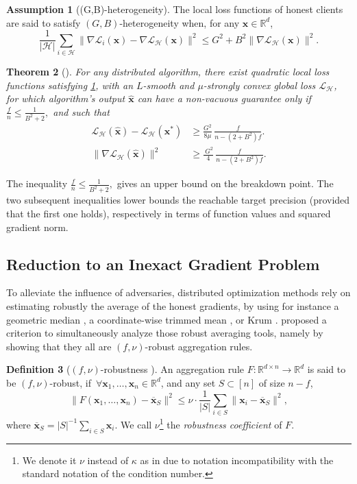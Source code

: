 \documentclass{article}
\def\vx{{\bm{x}}}
\newcommand{\R}{\mathbb{R}}
\newcommand{\cH}{\mathcal{H}}
\newcommand{\cL}{\mathcal{L}}
\theoremstyle{plain}
\newtheorem{theorem}{Theorem}[section]
\theoremstyle{definition}
\newtheorem{definition}[theorem]{Definition}
\newtheorem{assumption}[theorem]{Assumption}
\theoremstyle{remark}
\begin{document}
\begin{assumption}[(G,B)-heterogeneity]
\label{asmpt:GB_heterogeneity}
    The local loss functions of honest clients are said to satisfy {$(G,B)$-heterogeneity} when, for any $\vx \in \R^d$, 
    \[
    \frac{1}{|\cH|}\sum_{i \in \cH} \|\nabla \cL_i(\vx) - \nabla \cL_{\cH}(\vx)\|^2 \le G^2 + B^2\|\nabla \cL_{\cH}(\vx)\|^2.
    \]
\end{assumption}

    


\begin{theorem}[\citet{allouah2024robust}]
\label{thm:allouha_lower_bound}
  For any distributed algorithm, there exist quadratic local loss functions satisfying \cref{asmpt:GB_heterogeneity}, with an $L$-smooth and $\mu$-strongly convex global loss $\cL_{\cH}$, for which  algorithm's  output $\hat{\vx}$ can have a non-vacuous guarantee only if $ \frac{f}{n}\le \frac{1}{B^2 + 2},$ and  such that
    \begin{align}
     \cL_{\cH}(\hat{\vx}) - \cL_{\cH}(\vx^*) &\ge \frac{G^2}{8\mu} \, \frac{f}{n - (2+B^2)f}. \label{eq:lb_functionvalue}\\
 \|\nabla \cL_{\cH}(\hat{\vx})\|^2 &\ge \frac{\:G^2}{4}\,\frac{f}{n - (2+B^2)f}. \label{eq:lb_gradnorm}
\end{align}
\end{theorem}
The  inequality $ \frac{f}{n}\le \frac{1}{B^2 + 2},$ gives an upper bound on the breakdown point. The two subsequent inequalities lower bounds the reachable target precision (provided that the first one holds), respectively in terms of function values and squared gradient norm.


\subsection{Reduction to an Inexact Gradient Problem}
\label{subsec:reduction}
To alleviate the influence of adversaries, distributed optimization methods rely on estimating robustly the average of the honest gradients, by using for instance a geometric median \citep{small1990survey, pillutla2022robust}, a coordinate-wise trimmed mean \citep{yin2018byzantine}, or Krum \citep{blanchard2017machine}. \citet{allouah2023fixing} proposed a criterion to simultaneously analyze those robust averaging tools, namely by showing that they all are $(f,\nu)$-robust aggregation rules.


\begin{definition}[$(f,\nu)$-robustness \citep{allouah2023fixing}]
\label{def:f_kappa_robustness}
    An aggregation rule $F:\R^{d\times n}\rightarrow \R^d$ is said to be $(f,\nu)$-robust, if $\,\forall \vx_1,\ldots,\vx_n\in \R^d$, and any set $S\subset [n]$ of size $n-f$, 
    \[
    \|F(\vx_1,\ldots,\vx_n) - \overline{\vx}_S\|^2 \le \nu \cdot \frac{1}{|S|}\sum_{i\in S}\|\vx_i - \overline{\vx}_S\|^2,
    \]
    where $\overline{\vx}_S = |S|^{-1}\sum_{i\in S}\vx_i$. We call $\nu$\footnote{We denote it $\nu$ instead of $\kappa$ as in \citet{allouah2023fixing} due to notation incompatibility with the standard notation of the condition number.} the \textit{robustness coefficient} of $F$.
\end{definition}
\end{document}
